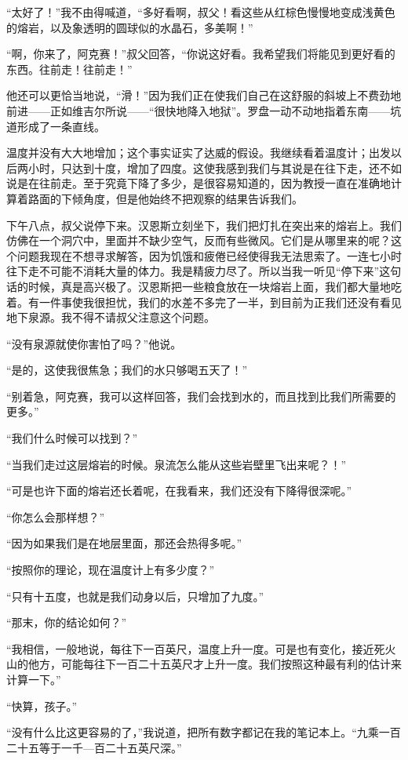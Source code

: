 \documentclass[10pt]{book}
\begin{document}
“太好了！”我不由得喊道，“多好看啊，叔父！看这些从红棕色慢慢地变成浅黄色的熔岩，以及象透明的圆球似的水晶石，多美啊！”

“啊，你来了，阿克赛！”叔父回答，“你说这好看。我希望我们将能见到更好看的东西。往前走！往前走！”

他还可以更恰当地说，“滑！”因为我们正在使我们自己在这舒服的斜坡上不费劲地前进——正如维吉尔所说——“很快地降入地狱”。罗盘一动不动地指着东南——坑道形成了一条直线。

温度并没有大大地增加；这个事实证实了达威的假设。我继续看着温度计；出发以后两小时，只达到十度，增加了四度。这使我感到我们与其说是在往下走，还不如说是在往前走。至于究竟下降了多少，是很容易知道的，因为教授一直在准确地计算着路面的下倾角度，但是他始终不把观察的结果告诉我们。

下午八点，叔父说停下来。汉恩斯立刻坐下，我们把灯扎在突出来的熔岩上。我们仿佛在一个洞穴中，里面并不缺少空气，反而有些微风。它们是从哪里来的呢？这个问题我现在不想寻求解答，因为饥饿和疲倦已经使得我无法思索了。一连七小时往下走不可能不消耗大量的体力。我是精疲力尽了。所以当我一听见“停下来”这句话的时候，真是高兴极了。汉恩斯把一些粮食放在一块熔岩上面，我们都大量地吃着。有一件事使我很担忧，我们的水差不多完了一半，到目前为正我们还没有看见地下泉源。我不得不请叔父注意这个问题。

“没有泉源就使你害怕了吗？”他说。

“是的，这使我很焦急；我们的水只够喝五天了！”

“别着急，阿克赛，我可以这样回答，我们会找到水的，而且找到比我们所需要的更多。”

“我们什么时候可以找到？”

“当我们走过这层熔岩的时候。泉流怎么能从这些岩壁里飞出来呢？！”

“可是也许下面的熔岩还长着呢，在我看来，我们还没有下降得很深呢。”

“你怎么会那样想？”

“因为如果我们是在地层里面，那还会热得多呢。”

“按照你的理论，现在温度计上有多少度？”

“只有十五度，也就是我们动身以后，只增加了九度。”

“那末，你的结论如何？”

“我相信，一般地说，每往下一百英尺，温度上升一度。可是也有变化，接近死火山的他方，可能每往下一百二十五英尺才上升一度。我们按照这种最有利的估计来计算一下。”

“快算，孩子。”

“没有什么比这更容易的了，”我说道，把所有数字都记在我的笔记本上。“九乘一百二十五等于一千—百二十五英尺深。”
\end{document}
